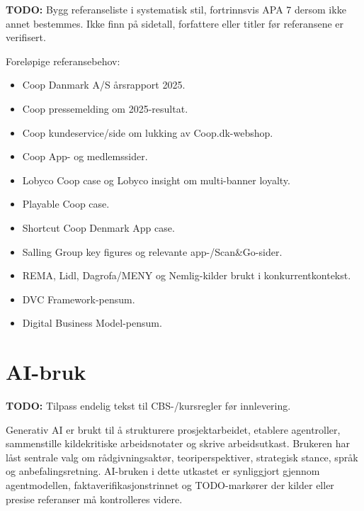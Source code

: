 \documentclass[12pt,a4paper]{article}
\newcommand{\todo}[1]{\par\noindent\textcolor{red!70!black}{\textbf{TODO:} #1}\par}
\begin{document}
\todo{Bygg referanseliste i systematisk stil, fortrinnsvis APA 7 dersom ikke annet bestemmes. Ikke finn på sidetall, forfattere eller titler før referansene er verifisert.}

Foreløpige referansebehov:

\begin{itemize}
  \item Coop Danmark A/S årsrapport 2025.
  \item Coop pressemelding om 2025-resultat.
  \item Coop kundeservice/side om lukking av Coop.dk-webshop.
  \item Coop App- og medlemssider.
  \item Lobyco Coop case og Lobyco insight om multi-banner loyalty.
  \item Playable Coop case.
  \item Shortcut Coop Denmark App case.
  \item Salling Group key figures og relevante app-/Scan\&Go-sider.
  \item REMA, Lidl, Dagrofa/MENY og Nemlig-kilder brukt i konkurrentkontekst.
  \item DVC Framework-pensum.
  \item Digital Business Model-pensum.
\end{itemize}

\section{AI-bruk}

\todo{Tilpass endelig tekst til CBS-/kursregler før innlevering.}

Generativ AI er brukt til å strukturere prosjektarbeidet, etablere agentroller, sammenstille kildekritiske arbeidsnotater og skrive arbeidsutkast. Brukeren har låst sentrale valg om rådgivningsaktør, teoriperspektiver, strategisk stance, språk og anbefalingsretning. AI-bruken i dette utkastet er synliggjort gjennom agentmodellen, faktaverifikasjonstrinnet og TODO-markører der kilder eller presise referanser må kontrolleres videre.
\end{document}
